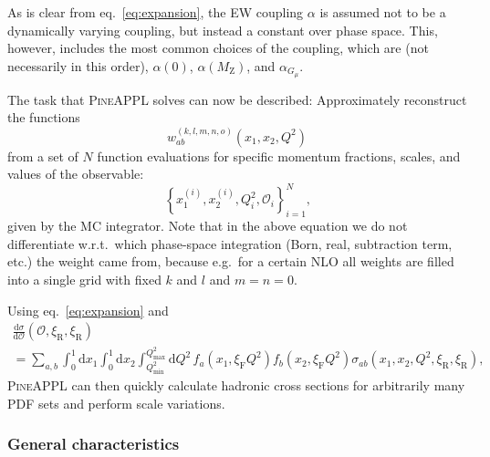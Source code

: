 As is clear from eq.~\eqref{eq:expansion}, the EW coupling $\alpha$ is assumed not to be a dynamically varying coupling, but instead a constant over phase space.
This, however, includes the most common choices of the coupling, which are (not necessarily in this order), $\alpha (0)$, $\alpha (M_\mathrm{Z})$, and $\alpha_{G_\mu}$.

The task that \textsc{PineAPPL} solves can now be described: Approximately reconstruct the functions
\begin{equation}
w_{ab}^{(k,l,m,n,o)} \left( x_1, x_2, Q^2 \right)
\end{equation}
from a set of $N$ function evaluations for specific momentum fractions, scales, and values of the observable:
\begin{equation}
\left\{ x_1^{(i)}, x_2^{(i)}, Q^2_i, \mathcal{O}_i \right\}_{i=1}^N \text{,}
\end{equation}
given by the MC integrator.
Note that in the above equation we do not differentiate w.r.t.\ which phase-space integration (Born, real, subtraction term, etc.) the weight came from, because e.g.\ for a certain NLO all weights are filled into a single grid with fixed $k$ and $l$ and $m=n=0$.

Using eq.~\eqref{eq:expansion} and
\begin{multline}
\frac{\mathrm{d} \sigma}{\mathrm{d} \mathcal{O}} (\mathcal{O}, \xi_\mathrm{R}, \xi_\mathrm{R}) \\
= \sum_{a,b} \int_0^1 \mathrm{d} x_1 \int_0^1 \mathrm{d} x_2 \int_{Q^2_\mathrm{min}}^{Q^2_\mathrm{max}} \mathrm{d} Q^2 \, f_a (x_1, \xi_\mathrm{F} Q^2) f_b (x_2, \xi_\mathrm{F} Q^2) \sigma_{ab} (x_1, x_2, Q^2, \xi_\mathrm{R}, \xi_\mathrm{R}) \text{,}
\label{eq:pineappl-convolution}
\end{multline}
\textsc{PineAPPL} can then quickly calculate hadronic cross sections for arbitrarily many PDF sets and perform scale variations.

\subsubsection{General characteristics}

